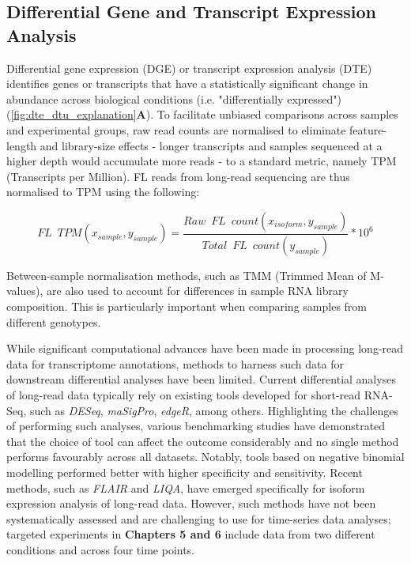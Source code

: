 \subsection{Differential Gene and Transcript Expression Analysis}
Differential gene expression (DGE) or transcript expression analysis (DTE) identifies genes or transcripts that have a statistically significant change in abundance across biological conditions (i.e. "differentially expressed") (\cref{fig:dte_dtu_explanation}\textbf{A}). To facilitate unbiased comparisons across samples and experimental groups, raw read counts are normalised to eliminate feature-length and library-size effects - longer transcripts and samples sequenced at a higher depth would accumulate more reads - to a standard metric, namely TPM (Transcripts per Million). FL reads from long-read sequencing are thus normalised to TPM using the following: 

\begin{myequation}[!h]
	\begin{equation}
		FL\;\:TPM (x_{sample},y_{sample})=\frac{Raw\;\:FL\;\:count (x_{isoform},y_{sample})}{Total\;\:FL\;\:count (y_{sample})} *10^6
	\end{equation}
\end{myequation}

Between-sample normalisation methods, such as TMM\cite{Robinson2010} (Trimmed Mean of M-values), are also used to account for differences in sample RNA library composition. This is particularly important when comparing samples from different genotypes. 

While significant computational advances have been made in processing long-read data for transcriptome annotations, methods to harness such data for downstream differential analyses have been limited. Current differential analyses of long-read data typically rely on existing tools developed for short-read RNA-Seq\cite{Amarasinghe2020}, such as \textit{DESeq}, \textit{maSigPro}, \textit{edgeR}, among others. Highlighting the challenges of performing such analyses, various benchmarking studies have demonstrated that the choice of tool can affect the outcome considerably and no single method performs favourably across all datasets. Notably, tools based on negative binomial modelling performed better with higher specificity and sensitivity\cite{Rapaport2013}. Recent methods, such as \textit{FLAIR} and \textit{LIQA}\cite{Hu2021}, have emerged specifically for isoform expression analysis of long-read data. However, such methods have not been systematically assessed and are challenging to use for time-series data analyses; targeted experiments in \textbf{Chapters 5 and 6} include data from two different conditions and across four time points. 

